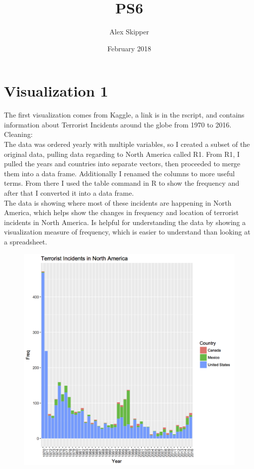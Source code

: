 \documentclass{article}
\title{PS6}
\author{Alex Skipper }
\date{February 2018}
\begin{document}
\maketitle


\section{Visualization 1}

The first visualization comes from Kaggle, a link is in the rscript, and contains information about Terrorist Incidents around the globe from 1970 to 2016. \\

Cleaning:\\
The data was ordered yearly with multiple variables, so I created a subset of the original data, pulling data regarding to North America called R1. From R1, I pulled the years and countries into separate vectors, then proceeded to merge them into a data frame. Additionally I renamed the columns to more useful terms.  From there I used the table command in R to show the frequency and after that I converted it into a data frame.
\\
The data is showing where most of these incidents are happening in North America, which helps show the changes in frequency and location of terrorist incidents in North America. Is helpful for understanding the data by showing a visualization measure of frequency, which is easier to understand than looking at a spreadsheet. 
\\
\begin{figure}[H]
\centering
\includegraphics[scale=.8]{Visual_1_PS6.png}
\end{figure}\\
\newpage
\end{document}
